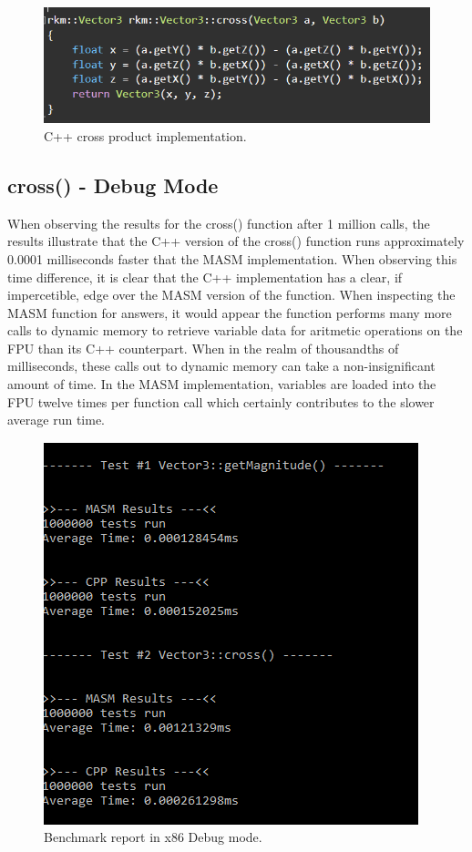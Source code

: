 \documentclass[12pt]{article}
\begin{document}
\begin{figure}[!htb]
  \centering
  \includegraphics[scale=0.8]{img/cross.PNG}
  \caption{C++ cross product implementation.}
  \label{fig:cross}
\end{figure}

\subsection{cross() - Debug Mode}
When observing the results for the cross() function after 1 million calls, the results illustrate that the C++ version of the cross() function runs approximately 0.0001 milliseconds faster that the MASM implementation. When observing this time difference, it is clear that the C++ implementation has a clear, if impercetible, edge over the MASM version of the function. When inspecting the MASM function for answers, it would appear the function performs many more calls to dynamic memory to retrieve variable data for aritmetic operations on the FPU than its C++ counterpart. When in the realm of thousandths of milliseconds, these calls out to dynamic memory can take a non-insignificant amount of time. In the MASM implementation, variables are loaded into the FPU twelve times per function call which certainly contributes to the slower average run time.

\begin{figure}[!htb]
  \centering
  \includegraphics[scale=1.25]{img/debug_results.PNG}
  \caption{Benchmark report in x86 Debug mode.}
  \label{fig:debug}
\end{figure}
\end{document}
